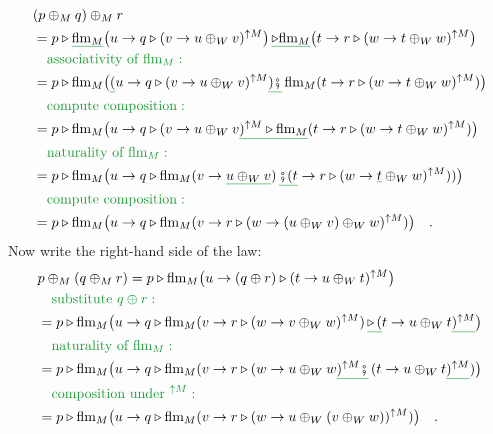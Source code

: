 \begin{align*}
 & (p\oplus_{M}q)\oplus_{M}r\\
 & =p\triangleright\gunderline{\text{flm}_{M}}\big(u\rightarrow q\triangleright(v\rightarrow u\oplus_{W}v)^{\uparrow M}\big)\,\gunderline{\triangleright\text{flm}_{M}}\big(t\rightarrow r\triangleright(w\rightarrow t\oplus_{W}w)^{\uparrow M}\big)\\
 & \quad{\color{greenunder}\text{associativity of }\text{flm}_{M}:}\quad\\
 & =p\triangleright\text{flm}_{M}\big(\gunderline (u\rightarrow q\triangleright(v\rightarrow u\oplus_{W}v)^{\uparrow M}\gunderline{)\bef}\,\text{flm}_{M}(t\rightarrow r\triangleright(w\rightarrow t\oplus_{W}w)^{\uparrow M})\big)\\
 & \quad{\color{greenunder}\text{compute composition}:}\quad\\
 & =p\triangleright\text{flm}_{M}\big(u\rightarrow q\triangleright(v\rightarrow u\oplus_{W}v\gunderline{)^{\uparrow M}\triangleright\text{flm}_{M}}(t\rightarrow r\triangleright(w\rightarrow t\oplus_{W}w)^{\uparrow M})\big)\\
 & \quad{\color{greenunder}\text{naturality of }\text{flm}_{M}:}\quad\\
 & =p\triangleright\text{flm}_{M}\big(u\rightarrow q\triangleright\text{flm}_{M}(v\rightarrow\gunderline{u\oplus_{W}v})\,\gunderline{\bef(t}\rightarrow r\triangleright(w\rightarrow\gunderline t\oplus_{W}w)^{\uparrow M}))\big)\\
 & \quad{\color{greenunder}\text{compute composition}:}\quad\\
 & =p\triangleright\text{flm}_{M}\big(u\rightarrow q\triangleright\text{flm}_{M}(v\rightarrow r\triangleright(w\rightarrow(u\oplus_{W}v)\oplus_{W}w)^{\uparrow M})\big)\quad.
\end{align*}
Now write the right-hand side of the law:
\begin{align*}
 & p\oplus_{M}(q\oplus_{M}r)=p\triangleright\text{flm}_{M}\big(u\rightarrow(q\oplus r)\triangleright(t\rightarrow u\oplus_{W}t)^{\uparrow M}\big)\\
 & \quad{\color{greenunder}\text{substitute }q\oplus r:}\quad\\
 & =p\triangleright\text{flm}_{M}\big(u\rightarrow q\triangleright\text{flm}_{M}(v\rightarrow r\triangleright(w\rightarrow v\oplus_{W}w)^{\uparrow M})\,\gunderline{\triangleright\,(}t\rightarrow u\oplus_{W}t\gunderline{)^{\uparrow M}}\big)\\
 & \quad{\color{greenunder}\text{naturality of }\text{flm}_{M}:}\quad\\
 & =p\triangleright\text{flm}_{M}\big(u\rightarrow q\triangleright\text{flm}_{M}(v\rightarrow r\triangleright(w\rightarrow u\oplus_{W}w\gunderline{)^{\uparrow M}\bef}\,(t\rightarrow u\oplus_{W}t\gunderline{)^{\uparrow M}})\big)\\
 & \quad{\color{greenunder}\text{composition under }^{\uparrow M}:}\quad\\
 & =p\triangleright\text{flm}_{M}\big(u\rightarrow q\triangleright\text{flm}_{M}(v\rightarrow r\triangleright(w\rightarrow u\oplus_{W}(v\oplus_{W}w))^{\uparrow M})\big)\quad.
\end{align*}
